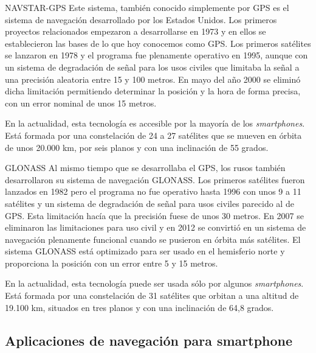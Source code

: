 \begin{definitionlist}
  \item[\acf{NAVSTAR-GPS}] Este sistema, también conocido simplemente por \acs{GPS} es el sistema
    de navegación desarrollado por los Estados Unidos. Los primeros proyectos relacionados empezaron
    a desarrollarse en 1973 y en ellos se establecieron las bases de lo que hoy conocemos como
    \acs{GPS}. Los primeros satélites se lanzaron en 1978 y el programa fue plenamente operativo en
    1995, aunque con un sistema de degradación de señal para los usos civiles que limitaba la señal
    a una precisión aleatoria entre 15 y 100 metros. En mayo del año 2000 se eliminó dicha
    limitación permitiendo determinar la posición y la hora de forma precisa, con un error nominal
    de unos 15 metros.

    En la actualidad, esta tecnología es accesible por la mayoría de los \emph{smartphones}. Está
    formada por una constelación de 24 a 27 satélites que se mueven en órbita de unos 20.000 km, por
    seis planos y con una inclinación de 55 grados.

  \item[GLONASS] Al mismo tiempo que se desarrollaba el \acs{GPS}, los rusos también desarrollaron
    su sistema de navegación \acs{GLONASS}. Los primeros satélites fueron lanzados en 1982 pero el
    programa no fue operativo hasta 1996 con unos 9 a 11 satélites y un sistema de degradación de
    señal para usos civiles parecido al de \acs{GPS}. Esta limitación hacía que la precisión fuese
    de unos 30 metros. En 2007 se eliminaron las limitaciones para uso civil y en 2012 se convirtió
    en un sistema de navegación plenamente funcional cuando se pusieron en órbita más satélites. El
    sistema \acs{GLONASS} está optimizado para ser usado en el hemisferio norte y proporciona la
    posición con un error entre 5 y 15 metros.

    En la actualidad, esta tecnología puede ser usada sólo por algunos \emph{smartphones}. Está
    formada por una constelación de 31 satélites que orbitan a una altitud de 19.100 km, situados en
    tres planos y con una inclinación de 64,8 grados.

\end{definitionlist}


\subsection{Aplicaciones de navegación para smartphone}

